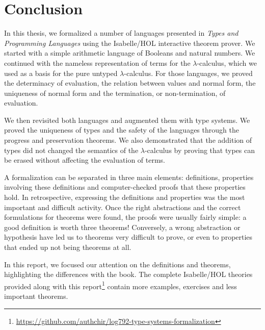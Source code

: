 \section{Conclusion}

In this thesis, we formalized a number of languages presented in \emph{Types and Programming
Languages} using the Isabelle/HOL interactive theorem prover. We started with a simple arithmetic
language of Booleans and natural numbers. We continued with the nameless representation of terms for
the $\lambda$-calculus, which we used as a basis for the pure untyped $\lambda$-calculus. For those
languages, we proved the determinacy of evaluation, the relation between values and normal form, the
uniqueness of normal form and the termination, or non-termination, of evaluation.

We then revisited both languages and augmented them with type systems. We proved the uniqueness of
types and the safety of the languages through the progress and preservation theorems. We also
demonstrated that the addition of types did not changed the semantics of the $\lambda$-calculus by
proving that types can be erased without affecting the evaluation of terms.

A formalization can be separated in three main elements: definitions, properties involving these
definitions and computer-checked proofs that these properties hold. In retrospective, expressing the
definitions and properties was the most important and difficult activity. Once the right
abstractions and the correct formulations for theorems were found, the proofs were usually fairly
simple: a good definition is worth three theorems! Conversely, a wrong abstraction or hypothesis
have led us to theorems very difficult to prove, or even to properties that ended up not being
theorems at all.

In this report, we focused our attention on the definitions and theorems, highlighting the
differences with the book. The complete Isabelle/HOL theories provided along with this
report\footnote{\url{https://github.com/authchir/log792-type-systems-formalization}} contain more
examples, exercises and less important theorems.

